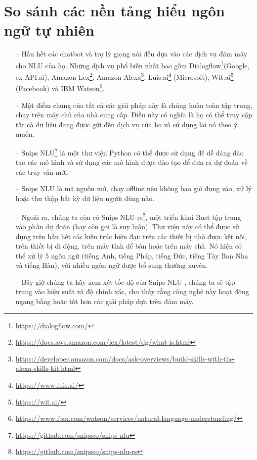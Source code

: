 \section{So sánh các nền tảng hiểu ngôn ngữ tự nhiên}

 \begin{itemize}
      \item[--] 	Hầu hết các chatbot và trợ lý giọng nói đều dựa vào các dịch vụ đám mây cho NLU của họ. Những dịch vụ phổ biến nhất bao gồm Dialogflow\footnote{\url{https://dialogflow.com/}}(Google, ex API.ai), Amazon Lex\footnote{\url{https://docs.aws.amazon.com/lex/latest/dg/what-is.html}}, Amazon Alexa\footnote{\url{https://developer.amazon.com/docs/ask-overviews/build-skills-with-the-alexa-skills-kit.html}}, Luis.ai\footnote{\url{https://www.luis.ai/}} (Microsoft), Wit.ai\footnote{\url{https://wit.ai/}} (Facebook) và IBM Watson\footnote{\url{https://www.ibm.com/watson/services/natural-language-understanding/}}.
	\item[--] Một điểm chung của tất cả các giải pháp này là chúng hoàn toàn tập trung, chạy trên máy chủ của nhà cung cấp. Điều này có nghĩa là họ có thể truy cập tất cả dữ liệu đang được gửi đến dịch vụ của họ và sử dụng lại nó theo ý muốn.
	\item[--] Snips NLU\footnote{\url{https://github.com/snipsco/snips-nlu}} là một thư viện Python có thể được sử dụng để dễ dàng đào tạo các mô hình và sử dụng các mô hình được đào tạo để đưa ra dự đoán về các truy vấn mới.
	
	\item[--] Snips NLU là mã nguồn mở, chạy offline nên không bao giờ đụng vào, xử lý hoặc thu thập bất kỳ dữ liệu người dùng nào.
	
	\item[--] Ngoài ra, chúng ta còn có Snips NLU-rs\footnote{\url{https://github.com/snipsco/snips-nlu-rs}}, một triển khai Rust tập trung vào phần dự đoán (hay còn gọi là suy luận). Thư viện này có thể được sử dụng trên hầu hết các kiến trúc hiện đại: trên các thiết bị nhỏ được kết nối, trên thiết bị di động, trên máy tính để bàn hoặc trên máy chủ. Nó hiện có thể xử lý 5 ngôn ngữ (tiếng Anh, tiếng Pháp, tiếng Đức, tiếng Tây Ban Nha và tiếng Hàn), với nhiều ngôn ngữ được bổ sung thường xuyên.
	\item[--] Bây giờ chúng ta hãy xem xét tốc độ của Snips NLU , chúng ta sẽ tập trung vào hiệu suất và độ chính xác, cho thấy rằng công nghệ này hoạt động ngang bằng hoặc tốt hơn các giải pháp dựa trên đám mây.
	 

\end{itemize}
